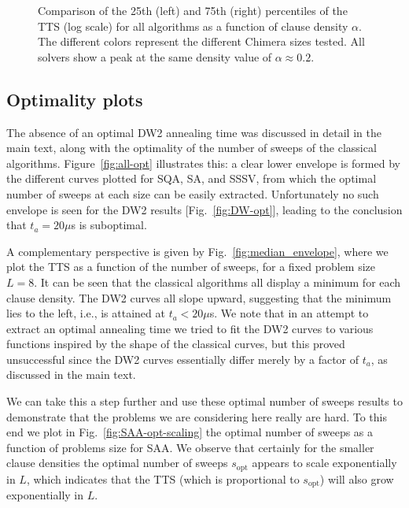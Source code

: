 \begin{figure}
\begin{center}
\caption{
Comparison of the 25th (left) and 75th (right) percentiles of the TTS (log scale) for all algorithms as a function of clause density $\alpha$. The different colors represent the different Chimera sizes tested.  All solvers show a peak at the same density value of $\alpha \approx 0.2$.}
\label{fig:pt_25_75}
\end{center}
\end{figure}

\subsection{Optimality plots}
\label{sec:optimality}

The absence of an optimal DW2 annealing time was discussed in detail in the main text, along with the optimality of the number of sweeps of the classical algorithms. Figure~\ref{fig:all-opt} illustrates this: a clear lower envelope is formed by the different curves plotted for SQA, SA, and SSSV, from which the optimal number of sweeps at each size can be easily extracted. Unfortunately no such envelope is seen for the DW2 results [Fig.~\ref{fig:DW-opt}], leading to the conclusion that $t_a=20\mu$s is suboptimal.

A complementary perspective is given by Fig.~\ref{fig:median_envelope}, where we plot the TTS as a function of the number of sweeps, for a fixed problem size $L=8$. It can be seen that the classical algorithms all display a minimum for each clause density. The DW2 curves all slope upward, suggesting that the minimum lies to the left, i.e., is attained at $t_a < 20\mu$s. We note that in an attempt to extract an optimal annealing time
we tried to fit the DW2 curves to various functions inspired by the shape of the classical curves, but this proved unsuccessful since the DW2 curves essentially differ merely by a factor of $t_a$, as discussed in the main text.

We can take this a step further and use these optimal number of sweeps results to demonstrate that the problems we are considering here really are hard. To this end we plot in Fig.~\ref{fig:SAA-opt-scaling} the optimal number of sweeps as a function of problems size for SAA. We observe that certainly for the smaller clause densities the optimal number of sweeps $s_\textrm{opt}$ appears to scale exponentially in $L$, which indicates that the TTS (which is proportional to $s_\textrm{opt}$) will also grow exponentially in $L$.

